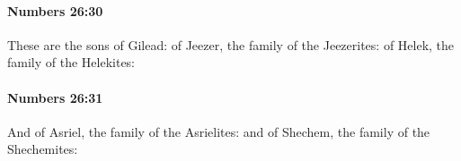 		\paragraph{Numbers 26:30} %
			\label{NUMBERS-26-30}

			These are the sons of Gilead: of Jeezer, the family of the Jeezerites: of Helek, the family of the Helekites:


		\paragraph{Numbers 26:31} %
			\label{NUMBERS-26-31}

			And of Asriel, the family of the Asrielites: and of Shechem, the family of the Shechemites:


